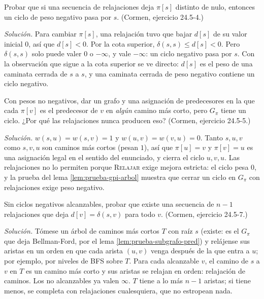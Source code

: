 \documentclass[11pt,letterpaper]{article}
\begin{document}
\begin{ejercicio}\label{ej:caminos-pi-fuente}
  Probar que si una secuencia de relajaciones deja $\pi[s]$ distinto
  de nulo, entonces un ciclo de peso negativo pasa por $s$. (Cormen,
  ejercicio 24.5-4.)

  \emph{Solución.} Para cambiar $\pi[s]$, una relajación tuvo que
  bajar $d[s]$ de su valor inicial $0$, así que $d[s] < 0$. Por la
  cota superior, $\delta(s, s) \le d[s] < 0$. Pero $\delta(s, s)$ solo
  puede valer $0$ o $-\infty$, y vale $-\infty$: un ciclo negativo pasa
  por $s$. Con la observación que sigue a la cota superior se ve
  directo: $d[s]$ es el peso de una caminata cerrada de $s$ a $s$, y
  una caminata cerrada de peso negativo contiene un ciclo negativo.
\end{ejercicio}

\begin{ejercicio}
  Con pesos no negativos, dar un grafo y una asignación de
  predecesores en la que cada $\pi[v]$ es el predecesor de $v$ en
  \emph{algún} camino más corto, pero $G_\pi$ tiene un ciclo. ¿Por qué
  las relajaciones nunca producen eso? (Cormen, ejercicio 24.5-5.)

  \emph{Solución.} $w(s, u) = w(s, v) = 1$ y $w(u, v) = w(v, u) = 0$.
  Tanto $s, u, v$ como $s, v, u$ son caminos más cortos (pesan $1$),
  así que $\pi[u] = v$ y $\pi[v] = u$ es una asignación legal en el
  sentido del enunciado, y cierra el ciclo $u, v, u$. Las relajaciones
  no lo permiten porque \textsc{Relajar} exige mejora estricta: el
  ciclo pesa $0$, y la prueba del lema \ref{lem:prueba-gpi-arbol}
  muestra que cerrar un ciclo en $G_\pi$ con relajaciones exige peso
  negativo.
\end{ejercicio}

\begin{ejercicio}
  Sin ciclos negativos alcanzables, probar que existe una secuencia de
  $n - 1$ relajaciones que deja $d[v] = \delta(s, v)$ para todo $v$.
  (Cormen, ejercicio 24.5-7.)

  \emph{Solución.} Tómese un árbol de caminos más cortos $T$ con raíz
  $s$ (existe: es el $G_\pi$ que deja Bellman-Ford, por el lema
  \ref{lem:prueba-subgrafo-pred}) y relájense sus aristas en un orden
  en que cada arista $(u, v)$ venga después de la que entra a $u$; por
  ejemplo, por niveles de BFS sobre $T$. Para cada alcanzable $v$, el
  camino de $s$ a $v$ en $T$ es un camino más corto y sus aristas se
  relajan en orden: relajación de caminos. Los no alcanzables ya
  valen $\infty$. $T$ tiene a lo más $n - 1$ aristas; si tiene menos,
  se completa con relajaciones cualesquiera, que no estropean nada.
\end{ejercicio}
\end{document}
